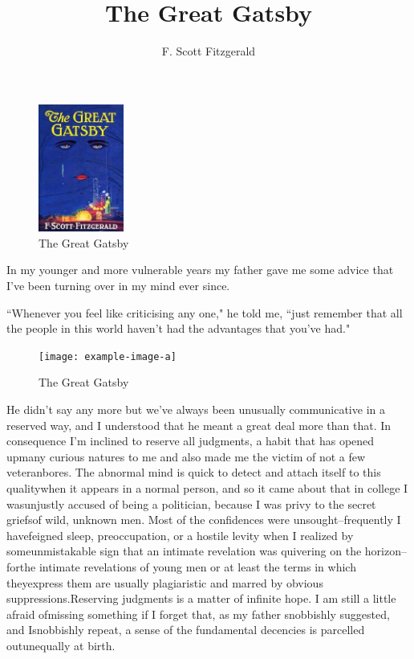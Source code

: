 \documentclass[12pt,a4paper]{report}
\title{The Great Gatsby}
\author{F. Scott Fitzgerald}
\date{}
\begin{document}
\maketitle

\begin{figure}[ht!]
   \centering
     \includegraphics[width=0.25\textwidth]{images/jacket.jpg}
   \caption{The Great Gatsby}
\end{figure}

In my younger and more vulnerable years my father gave me some advice that I've been turning over in my mind ever since.

``Whenever you feel like criticising any one," he told me, ``just
remember that all the people in this world haven't had the advantages
that you've had." \cite{cite2}

\begin{figure}[h]
   \centering
     \texttt{[image: example-image-a]}
   \caption{The Great Gatsby}
\end{figure}

He didn't say any more but we've always been unusually communicative in a reserved way, and I understood that he meant a great deal more than that. In consequence I'm inclined to reserve all judgments, a habit that has opened upmany curious natures to me and also made me the victim of not a few veteranbores. The abnormal mind is quick to detect and attach itself to this qualitywhen it appears in a normal person, and so it came about that in college I wasunjustly accused of being a politician, because I was privy to the secret griefsof wild, unknown men. Most of the confidences were unsought--frequently I havefeigned sleep, preoccupation, or a hostile levity when I realized by someunmistakable sign that an intimate revelation was quivering on the horizon--forthe intimate revelations of young men or at least the terms in which theyexpress them are usually plagiaristic and marred by obvious suppressions.Reserving judgments is a matter of infinite hope. I am still a little afraid ofmissing something if I forget that, as my father snobbishly suggested, and Isnobbishly repeat, a sense of the fundamental decencies is parcelled outunequally at birth.
\end{document}
